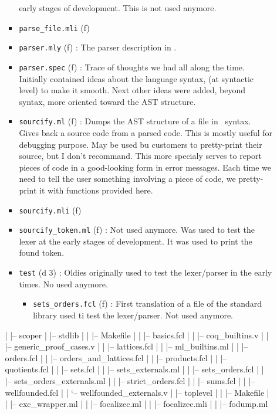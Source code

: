 \begin{itemize}
\begin{itemize}
\begin{itemize}
      early stages of development. This is not used anymore.
    \item {\tt parse\_file.mli} (f)
    \item {\tt parser.mly} (f) : The parser description in \ocamlyacc.
    \item {\tt parser.spec} (f) : Trace of thoughts we had all along
      the time. Initially contained ideas about the language syntax,
      (at syntactic level) to make it smooth. Next other ideas were
      added, beyond syntax, more oriented toward the AST structure.
    \item {\tt sourcify.ml} (f) : Dumps the AST structure of a file
      in \focalize\ syntax. Gives back a source code from a parsed
      code. This is mostly useful for debugging purpose. May be used
      bu customers to pretty-print their source, but I don't
      recommand. This more specialy serves to report pieces of code in
      a good-looking form in error messages. Each time we need to tell
      the user something involving a piece of code, we pretty-print it
      with functions provided here.
    \item {\tt sourcify.mli} (f)
    \item {\tt sourcify\_token.ml} (f) : Not used anymore. Was used to
      test the lexer at the early stages of development. It was used
      to print the found token.
    \item {\tt test} (d 3) : Oldies originally used to test the
      lexer/parser in the early times. No used anymore.
      \begin{itemize}
      \item {\tt sets\_orders.fcl} (f) : First translation of a file of
        the standard library used ti test the lexer/parser. Not used
        anymore.
      \end{itemize}
   \end{itemize}
|   |-- scoper
|   |-- stdlib
|   |   |-- Makefile
|   |   |-- basics.fcl
|   |   |-- coq\_builtins.v
|   |   |-- generic\_proof\_cases.v
|   |   |-- lattices.fcl
|   |   |-- ml\_builtins.ml
|   |   |-- orders.fcl
|   |   |-- orders\_and\_lattices.fcl
|   |   |-- products.fcl
|   |   |-- quotients.fcl
|   |   |-- sets.fcl
|   |   |-- sets\_externals.ml
|   |   |-- sets\_orders.fcl
|   |   |-- sets\_orders\_externals.ml
|   |   |-- strict\_orders.fcl
|   |   |-- sums.fcl
|   |   |-- wellfounded.fcl
|   |   `-- wellfounded\_externals.v
|   |-- toplevel
|   |   |-- Makefile
|   |   |-- exc\_wrapper.ml
|   |   |-- focalizec.ml
|   |   |-- focalizec.mli
|   |   |-- fodump.ml

\end{itemize}
\end{itemize}
